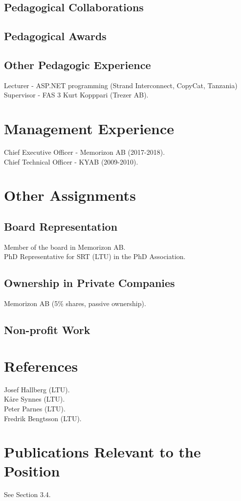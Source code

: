 \documentclass{article}
\begin{document}
\subsection{Pedagogical Collaborations}

\subsection{Pedagogical Awards}


\subsection{Other Pedagogic Experience}
Lecturer - ASP.NET programming (Strand Interconnect, CopyCat, Tanzania)
Supervisor - FAS 3 Kurt Kopppari (Trezer AB).\\


\section{Management Experience}
Chief Executive Officer - Memorizon AB (2017-2018).\\
Chief Technical Officer - KYAB (2009-2010).

\section{Other Assignments}
\subsection{Board Representation}
Member of the board in Memorizon AB. \\
PhD Representative for SRT (LTU) in the PhD Association.

\subsection{Ownership in Private Companies}
Memorizon AB (5\% shares, passive ownership).

\subsection{Non-profit Work}

\section{References}
Josef Hallberg (LTU). \\
Kåre Synnes (LTU). \\
Peter Parnes (LTU). \\
Fredrik Bengtsson (LTU). \\

\section{Publications Relevant to the Position}
See Section 3.4.
\end{document}
